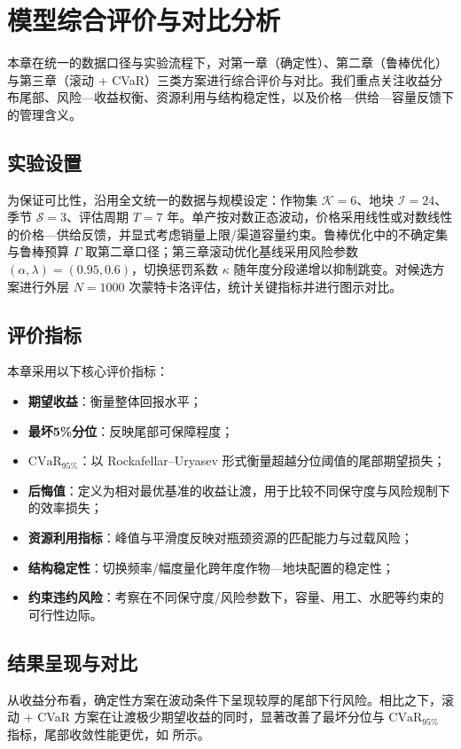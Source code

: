 \section{模型综合评价与对比分析}
\label{sec:evaluation}

本章在统一的数据口径与实验流程下，对第一章（确定性）、第二章（鲁棒优化）与第三章（滚动 + CVaR）三类方案进行综合评价与对比。我们重点关注收益分布尾部、风险—收益权衡、资源利用与结构稳定性，以及价格—供给—容量反馈下的管理含义。

\subsection{实验设置}
为保证可比性，沿用全文统一的数据与规模设定：作物集 $\mathcal K=6$、地块 $\mathcal I=24$、季节 $\mathcal S=3$、评估周期 $T=7$ 年。单产按对数正态波动，价格采用线性或对数线性的价格—供给反馈，并显式考虑销量上限/渠道容量约束。鲁棒优化中的不确定集与鲁棒预算 $\Gamma$ 取第二章口径；第三章滚动优化基线采用风险参数 $(\alpha,\lambda)=(0.95,0.6)$，切换惩罚系数 $\kappa$ 随年度分段递增以抑制跳变。对候选方案进行外层 $N=1000$ 次蒙特卡洛评估，统计关键指标并进行图示对比。

\subsection{评价指标}
本章采用以下核心评价指标：
\begin{itemize}
  \item \textbf{期望收益}：衡量整体回报水平；
  \item \textbf{最坏5\%分位}：反映尾部可保障程度；
  \item \textbf{$\mathrm{CVaR}_{95\%}$}：以 Rockafellar–Uryasev 形式衡量超越分位阈值的尾部期望损失；
  \item \textbf{后悔值}：定义为相对最优基准的收益让渡，用于比较不同保守度与风险规制下的效率损失；
  \item \textbf{资源利用指标}：峰值与平滑度反映对瓶颈资源的匹配能力与过载风险；
  \item \textbf{结构稳定性}：切换频率/幅度量化跨年度作物—地块配置的稳定性；
  \item \textbf{约束违约风险}：考察在不同保守度/风险参数下，容量、用工、水肥等约束的可行性边际。
\end{itemize}

\subsection{结果呈现与对比}
从收益分布看，确定性方案在波动条件下呈现较厚的尾部下行风险。相比之下，滚动 + CVaR 方案在让渡极少期望收益的同时，显著改善了最坏分位与 $\mathrm{CVaR}_{95\%}$ 指标，尾部收敛性能更优，如  所示。

